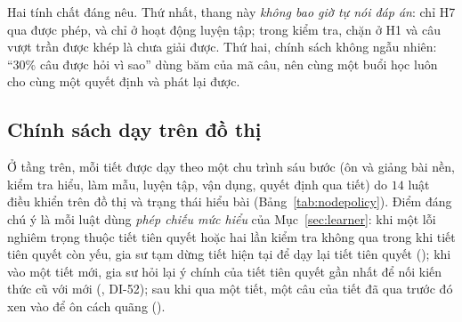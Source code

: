 Hai tính chất đáng nêu. Thứ nhất, thang này \emph{không bao giờ tự nói đáp án}: chỉ H7 qua  được phép, và chỉ ở hoạt động luyện tập; trong kiểm tra,  chặn ở H1 và câu vượt trần được khép là chưa giải được. Thứ hai, chính sách không ngẫu nhiên: ``30\% câu được hỏi vì sao'' dùng băm của mã câu, nên cùng một buổi học luôn cho cùng một quyết định và phát lại được.

\subsection{Chính sách dạy trên đồ thị}\label{sec:nodepolicy}
Ở tầng trên, mỗi tiết được dạy theo một chu trình sáu bước (ôn và giảng bài nền, kiểm tra hiểu, làm mẫu, luyện tập, vận dụng, quyết định qua tiết) do $14$ luật  điều khiển trên đồ thị và trạng thái hiểu bài (Bảng~\ref{tab:nodepolicy}). Điểm đáng chú ý là mỗi luật dùng \emph{phép chiếu mức hiểu} của Mục~\ref{sec:learner}: khi một lỗi nghiêm trọng thuộc tiết tiên quyết hoặc hai lần kiểm tra không qua trong khi tiết tiên quyết còn yếu, gia sư tạm dừng tiết hiện tại để dạy lại tiết tiên quyết (); khi vào một tiết mới, gia sư hỏi lại ý chính của tiết tiên quyết gần nhất để nối kiến thức cũ với mới (, DI-52); sau khi qua một tiết, một câu của tiết đã qua trước đó xen vào để ôn cách quãng ().

